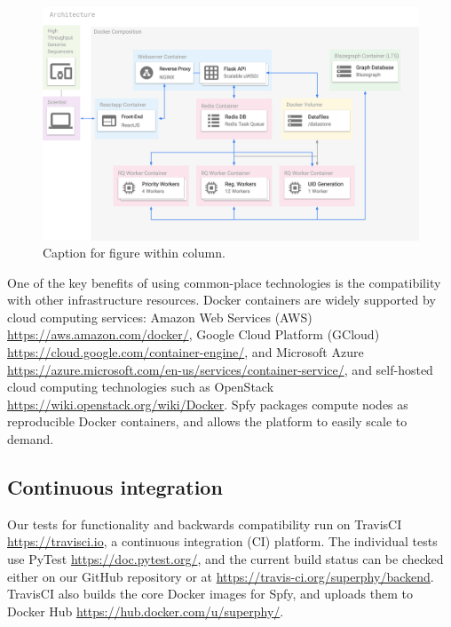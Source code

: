 \documentclass{article}
\begin{document}
\begin{figure}[!hb]
\begin{center}
\includegraphics[width=\textwidth]{images/docker}
\end{center}
\caption{Caption for figure within column.}
\label{fig-docker}
\end{figure}

One of the key benefits of using common-place technologies is the compatibility with other infrastructure resources.
Docker containers are widely supported by cloud computing services: Amazon Web Services (AWS) \url{https://aws.amazon.com/docker/}, Google Cloud Platform (GCloud) \url{https://cloud.google.com/container-engine/}, and Microsoft Azure \url{https://azure.microsoft.com/en-us/services/container-service/}, and self-hosted cloud computing technologies such as OpenStack \url{https://wiki.openstack.org/wiki/Docker}.
Spfy packages compute nodes as reproducible Docker containers, and allows the platform to easily scale to demand.

\subsection{Continuous integration}

Our tests for functionality and backwards compatibility run on TravisCI \url{https://travisci.io}, a continuous integration (CI) platform.
The individual tests use PyTest \url{https://doc.pytest.org/}, and the current build status can be checked either on our GitHub repository or at \url{https://travis-ci.org/superphy/backend}.
TravisCI also builds the core Docker images for Spfy, and uploads them to Docker Hub \url{https://hub.docker.com/u/superphy/}.
\end{document}
